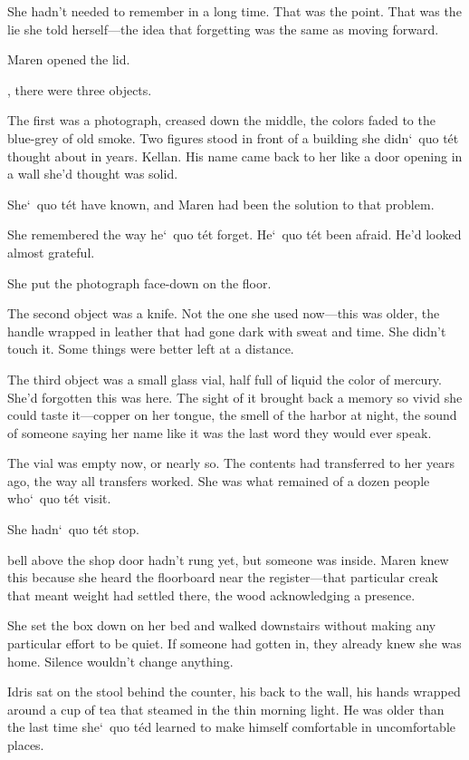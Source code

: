 \documentclass[12pt,letterpaper,openany]{book}
\begin{document}
\par
She hadn't needed to remember in a long time. That was the point. That was the lie she told herself—the idea that forgetting was the same as moving forward.
\par
Maren opened the lid.
\par
\hrulefillInside, there were three objects.
\par
The first was a photograph, creased down the middle, the colors faded to the blue-grey of old smoke. Two figures stood in front of a building she didn`\ quo t\'e{}t thought about in years. Kellan. His name came back to her like a door opening in a wall she'd thought was solid.
\par
She`\ quo t\'e{}t have known, and Maren had been the solution to that problem.
\par
She remembered the way he`\ quo t\'e{}t forget. He`\ quo t\'e{}t been afraid. He'd looked almost grateful.
\par
She put the photograph face-down on the floor.
\par
The second object was a knife. Not the one she used now—this was older, the handle wrapped in leather that had gone dark with sweat and time. She didn't touch it. Some things were better left at a distance.
\par
The third object was a small glass vial, half full of liquid the color of mercury. She'd forgotten this was here. The sight of it brought back a memory so vivid she could taste it—copper on her tongue, the smell of the harbor at night, the sound of someone saying her name like it was the last word they would ever speak.
\par
The vial was empty now, or nearly so. The contents had transferred to her years ago, the way all transfers worked. She was what remained of a dozen people who`\ quo t\'e{}t visit.
\par
She hadn`\ quo t\'e{}t stop.
\par
\hrulefillThe bell above the shop door hadn't rung yet, but someone was inside. Maren knew this because she heard the floorboard near the register—that particular creak that meant weight had settled there, the wood acknowledging a presence.
\par
She set the box down on her bed and walked downstairs without making any particular effort to be quiet. If someone had gotten in, they already knew she was home. Silence wouldn't change anything.
\par
Idris sat on the stool behind the counter, his back to the wall, his hands wrapped around a cup of tea that steamed in the thin morning light. He was older than the last time she`\ quo t\'e{}d learned to make himself comfortable in uncomfortable places.
\end{document}
